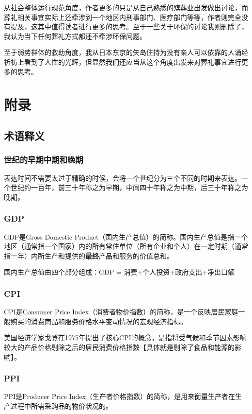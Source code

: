 \documentclass[12pt,oneside]{book}
\begin{document}
从社会整体运行规范角度，作者更多的只是从自己熟悉的殡葬业出发做出讨论，而葬礼相关事宜实际上还牵涉到一个地区内刑事部门、医疗部门等等，作者则完全没有提及，这其中值得读者进行更多的思考。至于一些关于环保的讨论我则删除了，我认为当下任何葬礼方式都还不牵涉环保问题。

至于弱势群体的救助角度，我从日本东京的矢岛住持为没有亲人可以依靠的人诵经祈祷上看到了人性的光辉，但显然我们还应当从这个角度出发来对葬礼事宜进行更多的思考。



\part{附录}
\chapter{术语释义}
\section{世纪的早期中期和晚期}
表达时间不需要太过于精确的时候，会将一个世纪分为三个不同的时期来表达。一个世纪约一百年，前三十年称之为早期，中间四十年称之为中期，后三十年称之为晚期。

\section{GDP}
GDP是Gross Domestic Product（国内生产总值）的简称。国内生产总值是指一个地区（通常指一个国家）内的所有常住单位（所有企业和个人）在一定时期（通常指一年）内所生产和提供的\textbf{最终}产品和服务的价值总和。

国内生产总值由四个部分组成：GDP = 消费+个人投资+政府支出+净出口额


\section{CPI}
CPI是Consumer Price Index（消费者物价指数）的简称，是一个反映居民家庭一般购买的消费商品和服务价格水平变动情况的宏观经济指标。

美国经济学家戈登在1975年提出了核心CPI的概念，是指将受气候和季节因素影响较大的产品价格剔除之后的居民消费价格指数【具体就是剔除了食品和能源的影响】。

\section{PPI}
PPI是Producer Price Index（生产者价格指数）的简称，是用来衡量生产者在生产过程中所需采购品的物价状况的。
\end{document}
